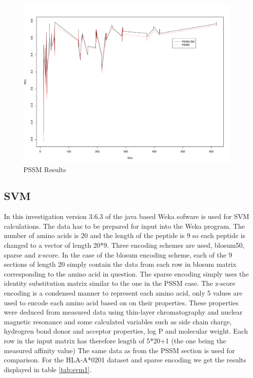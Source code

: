 \begin{figure}
\begin{center}
\includegraphics[width=12cm]{fig/pssm1.pdf}
\caption{PSSM Results}\label{fig:pssm1}
\end{center}
\end{figure}

\subsection*{SVM}
In this investigation version 3.6.3 of the java based Weka sofware is used for SVM calculations.
The data has to be prepared for input into the Weka program.
The number of amino acids is 20 and the length of the peptide is 9 so each peptide is changed to a vector of length 20*9. 
Three encoding schemes are used, blosum50, sparse and z-score. 
In the case of the blosum encoding scheme, each of the 9 sections of length 20 simply contain the data from each row in blosum matrix corresponding to the amino acid in question.
The sparse encoding simply uses the identity substitution matrix similar to the one in the PSSM case. 
The z-score encoding is a condensed manner to represent each amino acid, only 5 values are used to encode each amino acid based on on their properties. 
These properties were deduced from measured data using thin-layer chromatography and nuclear magnetic resonance and some calculated variables 
such as side chain charge, hydrogren bond donor and acceptor properties, log P and molecular weight. 
Each row in the input matrix has therefore length of 5*20+1 (the one being the measured affinity value)
The same data as from the PSSM section is used for comparison. For the HLA-A*0201 dataset and sparse encoding we get the results displayed in table \ref{tab:svm1}.


